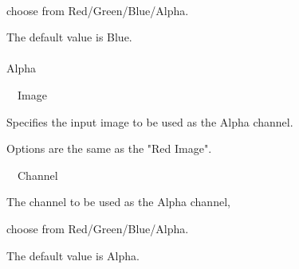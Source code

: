 \documentclass[a4paper,12pt]{article}
\begin{document}
\newpage

\thispagestyle{empty}

\ \vspace{-0.2em}
\par
choose from Red/Green/Blue/Alpha.\par
The default value is Blue.\\
\\
Alpha\par
\noindent \ \, Image\par
Specifies the input image to be used as the Alpha channel.\par
Options are the same as the "Red Image".\\
\par
\noindent \ \, Channel\par
The channel to be used as the Alpha channel,\par
choose from Red/Green/Blue/Alpha.\par
The default value is Alpha.
\end{document}
